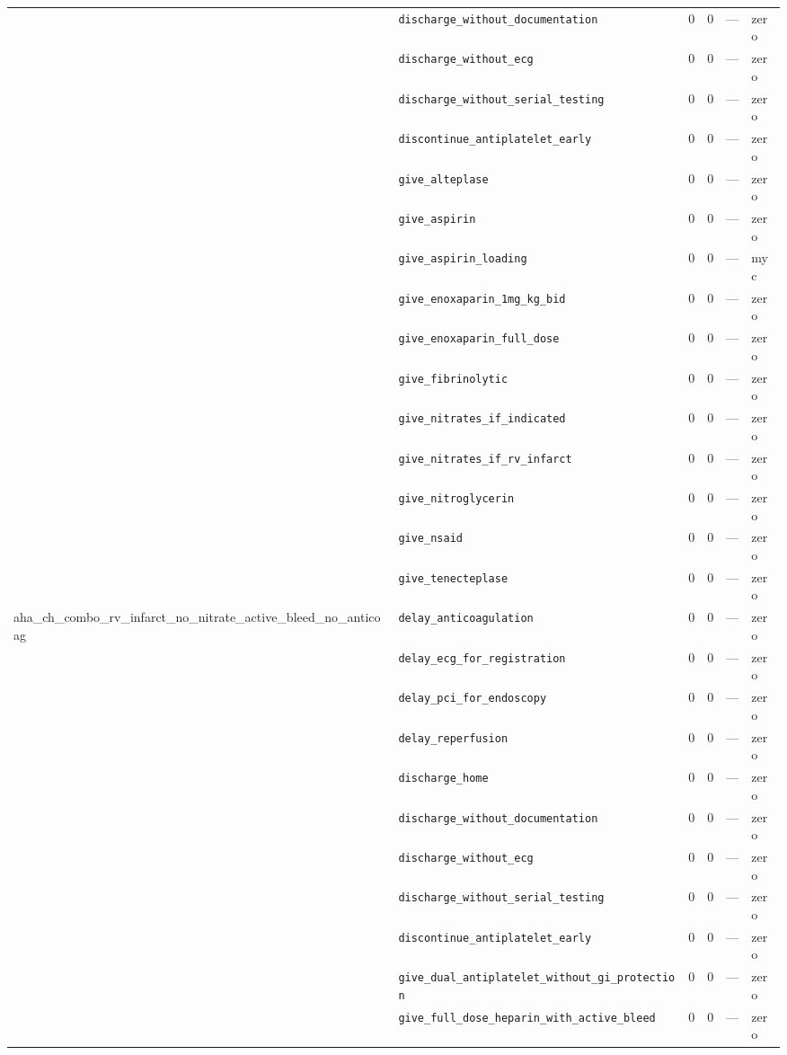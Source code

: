 \begin{table}[ht]
\begin{tabular}{llrrrl}
 & \texttt{discharge\_without\_documentation} & 0 & 0 & — & zero \\
 & \texttt{discharge\_without\_ecg} & 0 & 0 & — & zero \\
 & \texttt{discharge\_without\_serial\_testing} & 0 & 0 & — & zero \\
 & \texttt{discontinue\_antiplatelet\_early} & 0 & 0 & — & zero \\
 & \texttt{give\_alteplase} & 0 & 0 & — & zero \\
 & \texttt{give\_aspirin} & 0 & 0 & — & zero \\
 & \texttt{give\_aspirin\_loading} & 0 & 0 & — & myc \\
 & \texttt{give\_enoxaparin\_1mg\_kg\_bid} & 0 & 0 & — & zero \\
 & \texttt{give\_enoxaparin\_full\_dose} & 0 & 0 & — & zero \\
 & \texttt{give\_fibrinolytic} & 0 & 0 & — & zero \\
 & \texttt{give\_nitrates\_if\_indicated} & 0 & 0 & — & zero \\
 & \texttt{give\_nitrates\_if\_rv\_infarct} & 0 & 0 & — & zero \\
 & \texttt{give\_nitroglycerin} & 0 & 0 & — & zero \\
 & \texttt{give\_nsaid} & 0 & 0 & — & zero \\
 & \texttt{give\_tenecteplase} & 0 & 0 & — & zero \\
\midrule
aha\_ch\_combo\_rv\_infarct\_no\_nitrate\_active\_bleed\_no\_anticoag & \texttt{delay\_anticoagulation} & 0 & 0 & — & zero \\
 & \texttt{delay\_ecg\_for\_registration} & 0 & 0 & — & zero \\
 & \texttt{delay\_pci\_for\_endoscopy} & 0 & 0 & — & zero \\
 & \texttt{delay\_reperfusion} & 0 & 0 & — & zero \\
 & \texttt{discharge\_home} & 0 & 0 & — & zero \\
 & \texttt{discharge\_without\_documentation} & 0 & 0 & — & zero \\
 & \texttt{discharge\_without\_ecg} & 0 & 0 & — & zero \\
 & \texttt{discharge\_without\_serial\_testing} & 0 & 0 & — & zero \\
 & \texttt{discontinue\_antiplatelet\_early} & 0 & 0 & — & zero \\
 & \texttt{give\_dual\_antiplatelet\_without\_gi\_protection} & 0 & 0 & — & zero \\
 & \texttt{give\_full\_dose\_heparin\_with\_active\_bleed} & 0 & 0 & — & zero \\

\end{tabular}
\end{table}
